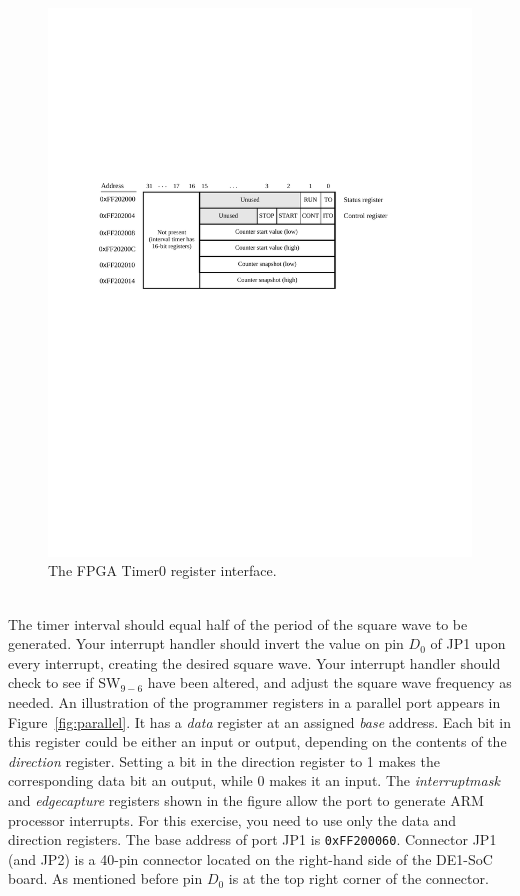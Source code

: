 \documentclass[epsfig,10pt,fullpage]{article}
\begin{document}
\begin{figure}[htb]
	\begin{center}
	\includegraphics[scale=1]{figures/fig_interval_port.pdf}
	\end{center}
	\caption{The FPGA Timer0 register interface.}
\label{fig:timer}
\end{figure}

~\\
\noindent
The timer interval should equal half of the period of the square wave to be generated. 
Your interrupt handler should invert the value on pin $D_0$ of JP1
upon every interrupt, creating the desired square wave. Your interrupt handler 
should check to see if SW$_{9-6}$ have been altered, and adjust the square wave frequency as 
needed. An illustration of the programmer registers in a parallel port appears in
Figure~\ref{fig:parallel}.
It has a {\it data} register at an assigned {\it base} address. Each bit in this register could be
either an input or output, depending on the contents of the {\it direction} register. Setting
a bit in the direction register to 1 makes the corresponding data bit an output, while 0
makes it an input. The
{\it interruptmask} and {\it edgecapture} registers shown in the figure allow the port to
generate ARM processor interrupts. For this exercise, you need to use only the data and
direction registers. The base address of port JP1 is \texttt{0xFF200060}. Connector JP1 
(and JP2) is a 40-pin connector located on the right-hand side of the DE1-SoC board. As
mentioned before pin $D_0$ is at the top right corner of the connector.
\end{document}
